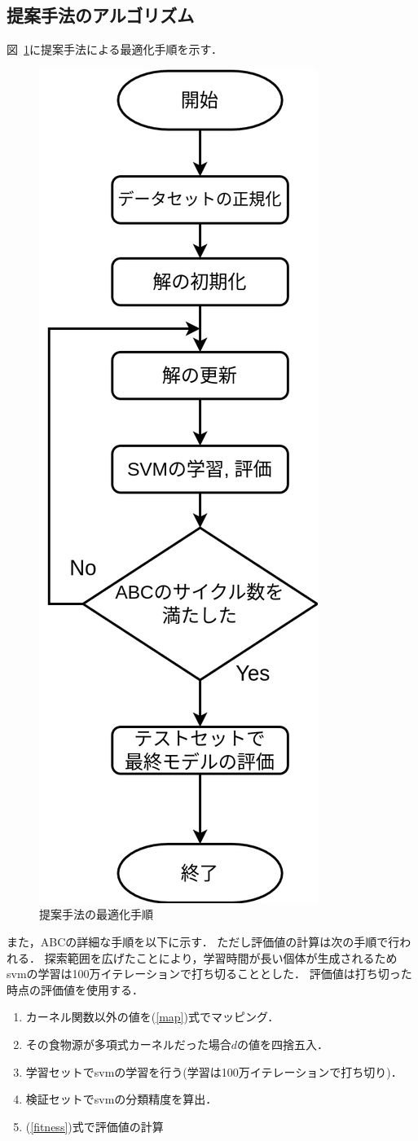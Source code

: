 \subsection{提案手法のアルゴリズム}
図~\ref{flowchart}に提案手法による最適化手順を示す．
\begin{figure}
    \centering
    \includegraphics[width=0.4\linewidth]{flowchart.png}
    \caption{提案手法の最適化手順} 
    \label{flowchart}
\end{figure}
また，ABCの詳細な手順を以下に示す．
ただし評価値の計算は次の手順で行われる．
探索範囲を広げたことにより，学習時間が長い個体が生成されるため
svmの学習は100万イテレーションで打ち切ることとした．
評価値は打ち切った時点の評価値を使用する．
\begin{enumerate}
    \item カーネル関数以外の値を(\ref{map})式でマッピング．
    \item その食物源が多項式カーネルだった場合$d$の値を四捨五入．
    \item 学習セットでsvmの学習を行う(学習は100万イテレーションで打ち切り)．
    \item 検証セットでsvmの分類精度を算出．
    \item (\ref{fitness})式で評価値の計算
\end{enumerate}

